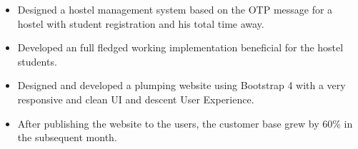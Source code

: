 \documentclass[10pt,a4paper]{altacv}
\begin{document}





\begin{fullwidth}
\makecvheader
\end{fullwidth}




\begin{itemize}
\item Designed a hostel management system based on the OTP message for a hostel with student registration and his total time away.
\item Developed an full fledged working implementation beneficial for the hostel students.

\end{itemize}

\divider

\begin{itemize}
\item Designed and developed a plumping website using Bootstrap 4 with a very responsive and clean UI and descent User Experience.

\item  After publishing the website to the users, the customer base grew by 60\% in the subsequent month.
\end{itemize}
\end{document}
